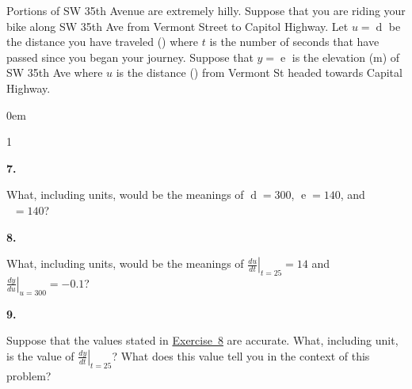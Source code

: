 \documentclass[12pt,]{book}
\theoremstyle{plain}
\theoremstyle{definition}
\numberwithin{equation}{section}
\newenvironment{exercisegroup}%
{\medskip\noindent}%
{\par\bigskip}%
\newlength{\exercisegroupindent}%
\newlength{\exercisegroupitemwidth}%
\newenvironment{exercisegrouplist}%
{\vspace{-\partopsep}%
\begin{adjustwidth}{\exercisegroupindent}{0em}}%
{\end{adjustwidth}%
\vspace{-\partopsep}%
\vspace{\baselineskip}}%
\newenvironment{exercisegroupbycol}[1]%
{\begin{exercisegrouplist}%
\vspace{-\multicolsep}%
\begin{multicols}{#1}%
\setlength{\parindent}{0em}%
\setlength{\exercisegroupitemwidth}{\linewidth}}%
{\end{multicols}%
\vspace{-\multicolsep}%
\end{exercisegrouplist}}%
\newenvironment{exercisegroupitem}[1]%
{\begin{minipage}[t]{\exercisegroupitemwidth}
\vspace{0pt}%
{\bfseries#1}%
\rule{0pt}{\baselineskip}}{\strut%
\end{minipage}%
\hspace{\columnsep}}%
\providecommand\phantomsection{}
\newcommand{\fe}[2]{\mathop{{#1}{\left(#2\right)}}}
\newcommand{\lzoa}[3]{\left.{\frac{d#1}{d#2}}\right|_{#3}}
\begin{document}
\begin{exercisegroup}%
Portions of SW 35th Avenue are extremely hilly.  Suppose that you are riding your bike along SW 35th Ave from Vermont Street to Capitol Highway.  Let \(u=\fe{d}{t}\) be the distance you have traveled (\si{\foot}) where \(t\) is the number of seconds that have passed since you began your journey.  Suppose that \(y=\fe{e}{u}\) is the elevation (\si{\meter}) of SW 35th Ave where \(u\) is the distance (\si{\foot}) from Vermont St headed towards Capital Highway.%
\begin{exercisegroupbycol}{1}%
\begin{exercisegroupitem}{7. }\phantomsection\hypertarget{exercise-314}{\null}
What, including units, would be the meanings of \(\fe{d}{25}=300\), \(\fe{e}{300}=140\), and \(\fe{\left(e\circ d\right)}{25}=140\)?%
\end{exercisegroupitem}%
\par%
\begin{exercisegroupitem}{8. }\phantomsection\hypertarget{exercise-leibniz-chain-rule}{\null}
What, including units, would be the meanings of \(\lzoa{u}{t}{t=25}=14\) and \(\lzoa{y}{u}{u=300}=-0.1\)?%
\end{exercisegroupitem}%
\par%
\begin{exercisegroupitem}{9. }\phantomsection\hypertarget{exercise-316}{\null}
Suppose that the values stated in \hyperref[exercise-leibniz-chain-rule]{Exercise~8} are accurate. What, including unit, is the value of \(\lzoa{y}{t}{t=25}\)? What does this value tell you in the context of this problem?%
\end{exercisegroupitem}%
\par%
\end{exercisegroupbycol}%
\end{exercisegroup}%
\end{document}
